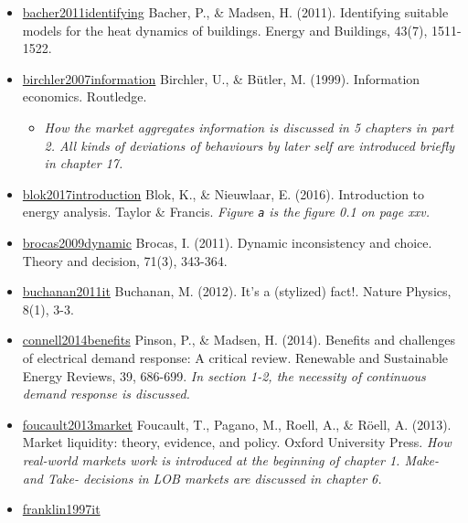 \documentclass[letterpaper,8pt,twocolumn,twoside,]{pinp}
\providecommand{\tightlist}{%
  \setlength{\itemsep}{0pt}\setlength{\parskip}{0pt}}
\begin{document}
\begin{itemize}
\tightlist
\item
  \href{https://www.sciencedirect.com/science/article/pii/S0378778811000491}{bacher2011identifying}
  Bacher, P., \& Madsen, H. (2011). Identifying suitable models for the
  heat dynamics of buildings. Energy and Buildings, 43(7), 1511-1522.
\item
  \href{https://www.taylorfrancis.com/books/9780203946558}{birchler2007information}
  Birchler, U., \& Bütler, M. (1999). Information economics. Routledge.

  \begin{itemize}
  \tightlist
  \item
    \emph{How the market aggregates information is discussed in 5
    chapters in part 2. All kinds of deviations of behaviours by later
    self are introduced briefly in chapter 17.}
  \end{itemize}
\item
  \href{https://www.taylorfrancis.com/books/9781315617213}{blok2017introduction}
  Blok, K., \& Nieuwlaar, E. (2016). Introduction to energy analysis.
  Taylor \& Francis. \emph{Figure \texttt{a} is the figure 0.1 on page
  xxv.}
\item
  \href{https://link.springer.com/article/10.1007/s11238-009-9183-x}{brocas2009dynamic}
  Brocas, I. (2011). Dynamic inconsistency and choice. Theory and
  decision, 71(3), 343-364.
\item
  \href{https://www.nature.com/articles/nphys2191}{buchanan2011it}
  Buchanan, M. (2012). It's a (stylized) fact!. Nature Physics, 8(1),
  3-3.
\item
  \href{https://www.sciencedirect.com/science/article/pii/S1364032114005504}{connell2014benefits}
  Pinson, P., \& Madsen, H. (2014). Benefits and challenges of
  electrical demand response: A critical review. Renewable and
  Sustainable Energy Reviews, 39, 686-699. \emph{In section 1-2, the
  necessity of continuous demand response is discussed.}
\item
  \href{https://www.oxfordscholarship.com/view/10.1093/acprof:oso/9780199936243.001.0001/acprof-9780199936243}{foucault2013market}
  Foucault, T., Pagano, M., Roell, A., \& Röell, A. (2013). Market
  liquidity: theory, evidence, and policy. Oxford University Press.
  \emph{How real-world markets work is introduced at the beginning of
  chapter 1. Make- and Take- decisions in LOB markets are discussed in
  chapter 6.}
\item
  \href{https://link.springer.com/chapter/10.1007/BFb0013570}{franklin1997it}

\end{itemize}
\end{document}

